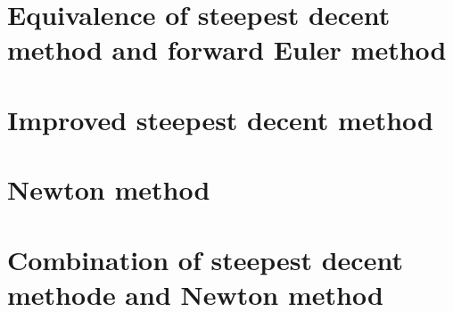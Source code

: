 \documentclass[a4paper,12pt]{article}
\begin{document}
\section{Equivalence of steepest decent method and forward Euler method}

\section{Improved steepest decent method}

\section{Newton method}

\section{Combination of steepest decent methode and Newton method}
\end{document}
